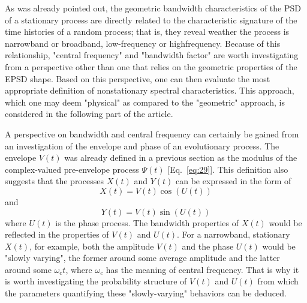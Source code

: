 \documentclass[12pt]{article}
\begin{document}
As was already pointed out, the geometric bandwidth characteristics of the PSD of a stationary process are directly related to the characteristic signature of the time histories of a random process; that is, they reveal weather the process is narrowband or broadband, low-frequency or highfrequency. Because of this relationship, "central frequency" and "bandwidth factor" are worth investigating from a perspective other than one that relies on the geometric properties of the EPSD shape. Based on this perspective, one can then evaluate the most appropriate definition of nonstationary spectral characteristics. This approach, which one may deem "physical" as compared to the "geometric" approach, is considered in the following part of the article.

A perspective on bandwidth and central frequency can certainly be gained from an investigation of the envelope and phase of an evolutionary process. The envelope $V(t)$ was already defined in a previous section as the modulus of the complex-valued pre-envelope process $\Psi(t)$ [Eq.~\eqref{eq:29}]. This definition also suggests that the processes $X(t)$ and $Y(t)$ can be expressed in the form of
\begin{equation}
X(t)=V(t) \cos (U(t))
\label{eq:48}
\end{equation}
and
\begin{equation}
Y(t)=V(t) \sin (U(t))
\label{eq:49}
\end{equation}
where $U(t)$ is the phase process.
The bandwidth properties of $X(t)$ would be reflected in the properties of $V(t)$ and $U(t)$. For a narrowband, stationary $X(t)$, for example, both the amplitude $V(t)$ and the phase $U(t)$ would be "slowly varying", the former around some average amplitude and the latter around some $\omega_{c} t$,
where $\omega_{c}$ has the meaning of central frequency. That is why it is worth investigating the probability structure of $V(t)$ and $U(t)$ from which the parameters quantifying these "slowly-varying" behaviors can be deduced.
\end{document}
